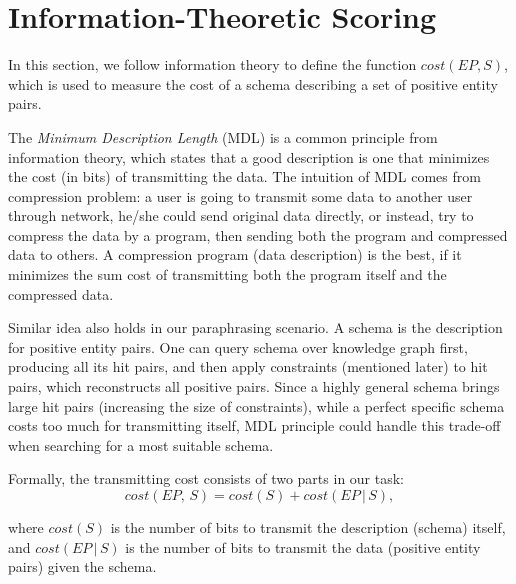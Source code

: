 \section{Information-Theoretic Scoring}
\label{sec:scoring}

In this section, we follow information theory to define the function
$cost(EP, S)$, which is used to measure the cost of a schema describing
a set of positive entity pairs.

The \textit{Minimum Description Length} (MDL) \cite{grunwald2007minimum}
is a common principle from information theory,
which states that a good description is one that minimizes the cost (in bits) of transmitting
the data.
The intuition of MDL comes from compression problem: a user is going to transmit some data
to another user through network, he/she could send original data directly, or instead, try to compress
the data by a program, then sending both the program and compressed data to others.
A compression program (data description) is the best, if it minimizes the sum cost of transmitting both
the program itself and the compressed data.

Similar idea also holds in our paraphrasing scenario.
A schema is the description for positive entity pairs. One can query schema over knowledge
graph first, producing all its hit pairs, and then apply constraints (mentioned later) to hit pairs,
which reconstructs all positive pairs.
Since a highly general schema brings large hit pairs (increasing the size of constraints),
while a perfect specific schema costs too much for transmitting itself, MDL principle
could handle this trade-off when searching for a most suitable schema.


Formally, the transmitting cost consists of two parts in our task:
\begin{equation}
    \label{eqn:mdl}
    cost(EP,\, S) = cost(S) + cost(EP\, |\, S),
\end{equation}

\noindent
where $cost(S)$ is the number of bits to transmit the description (schema) itself, and
$cost(EP\, |\, S)$ is the number of bits to transmit the data (positive entity pairs) given the schema.

